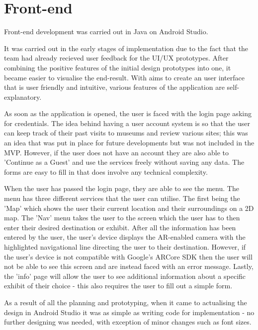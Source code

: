 \section{Front-end}

Front-end development was carried out in Java on Android Studio. 

It was carried out in the early stages of implementation due to the fact that the team had already recieved user feedback for the UI/UX prototypes. After combining the positive features of the initial design prototypes into one, it became easier to visualise the end-result. With aims to create an user interface that is user friendly and intuitive, various features of the application are self-explanatory. 

As soon as the application is opened, the user is faced with the login page asking for credentials. The idea behind having a user account system is so that the user can keep track of their past visits to museums and review various sites; this was an idea that was put in place for future developments but was not included in the MVP. However, if the user does not have an account they are also able to 'Continue as a Guest' and use the services freely without saving any data. The forms are easy to fill in that does involve any technical complexity.

When the user has passed the login page, they are able to see the menu. The menu has three different services that the user can utilise. The first being the 'Map' which shows the user their current location and their surroundings on a 2D map. The 'Nav' menu takes the user to the screen which the user has to then enter their desired destination or exhibit. After all the information has been entered by the user, the user's device displays the AR-enabled camera with the highlighted navigational line directing the user to their destination. However, if the user's device is not compatible with Google's ARCore SDK then the user will not be able to see this screen and are instead faced with an error message. Lastly, the 'info' page will allow the user to see additional information about a specific exhibit of their choice - this also requires the user to fill out a simple form.

As a result of all the planning and prototyping, when it came to actualising the design in Android Studio it was as simple as writing code for implementation - no further designing was needed, with exception of minor changes such as font sizes.


